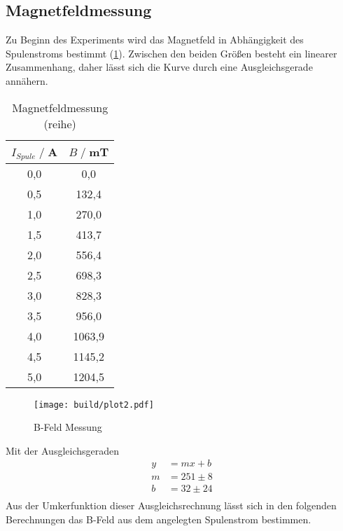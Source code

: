 \subsection{Magnetfeldmessung}
Zu Beginn des Experiments wird das Magnetfeld in Abhängigkeit des Spulenstroms bestimmt (\ref{tab:Br}).
Zwischen den beiden Größen besteht ein linearer Zusammenhang, daher lässt sich die Kurve durch eine Ausgleichsgerade annähern.
\begin{table}[H]
    \centering
    \begin{tabular}{c c}
        \toprule
        $I_{Spule} \;/\;$A & $B\;/\;$mT\\
        \midrule
        0,0                 &0,0\\
        0,5                 &132,4\\
        1,0                 &270,0\\
        1,5                 &413,7\\
        2,0                 &556,4\\  
        2,5                 &698,3\\
        3,0                 &828,3\\
        3,5                 &956,0\\
        4,0                 &1063,9\\
        4,5                 &1145,2\\
        5,0                 &1204,5\\
        \bottomrule
    \end{tabular}
    \caption{Magnetfeldmessung (reihe)}
    \label{tab:Br}
\end{table}
\begin{figure}[H]
    \centering
    \texttt{[image: build/plot2.pdf]}
    \caption{B-Feld Messung}
    \label{fig:Br}
\end{figure}
Mit der Ausgleichsgeraden
\begin{align*}
    y &= mx + b\\
    m &= 251\pm 8\\  
    b &= 32\pm 24\\
\end{align*}
Aus der Umkerfunktion dieser Ausgleichsrechnung lässt sich in den folgenden Berechnungen das B-Feld aus dem angelegten Spulenstrom bestimmen.

